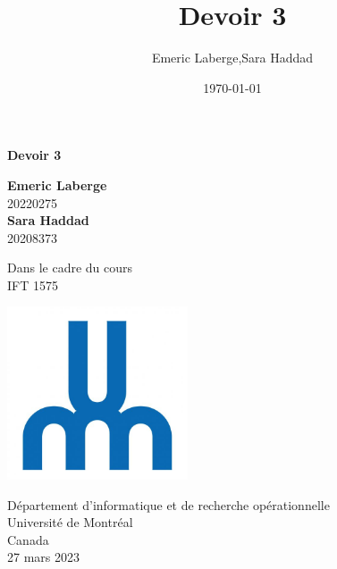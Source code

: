 \documentclass{article}
\title{Devoir 3}
\author{Emeric Laberge,Sara Haddad}
\date{\today}
\begin{document}
\begin{titlepage}
   \begin{center}
      \vspace*{1cm}
                  
      \Huge
      \textbf{Devoir 3} 
                  
      \vspace{0.5cm}
      \LARGE
                  
      \vspace{1.5cm}
                  
      \textbf{Emeric Laberge}\\ 20220275 \\ \textbf{Sara Haddad} \\ 20208373
                  
      \vfill
                  
      Dans le cadre du cours\\
      IFT 1575
      
                  
      \vspace{0.8cm}
                  
      \includegraphics[width=0.4\textwidth]{Université-de-Montréal.jpg}
                   
      \Large
      Département d'informatique et de recherche opérationnelle\\
      Université de Montréal\\
      Canada\\
      27 mars 2023
                  
    \end{center}
\end{titlepage}
\end{document}
